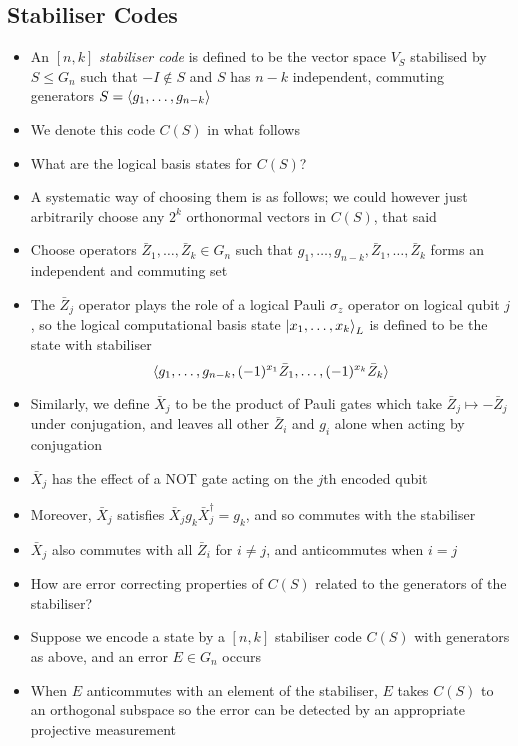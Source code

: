 \documentclass[12pt,a4paper]{article}
\numberwithin{equation}{section}
\begin{document}
	\subsection{Stabiliser Codes}
	\begin{itemize}
		\item An $[n,k]$ \textit{stabiliser code} is defined to be the vector space $V_{S}$ stabilised by $S\leq G_{n}$ such that $-I\notin S$ and $S$ has $n-k$ independent, commuting generators $S=\braket{g_{1},\ldots, g_{n-k}}$
		\item We denote this code $C(S)$ in what follows
		\item What are the logical basis states for $C(S)$?
		\item A systematic way of choosing them is as follows; we could however just arbitrarily choose any $2^{k}$ orthonormal vectors in $C(S)$, that said
		\item Choose operators $\bar{Z}_{1},\ldots, \bar{Z}_{k}\in G_{n}$ such that $g_{1},\ldots, g_{n-k},\bar{Z}_{1},\ldots, \bar{Z}_{k}$ forms an independent and commuting set
		\item The $\bar{Z}_{j}$ operator plays the role of a logical Pauli $\sigma_{z}$ operator on logical qubit $j$, so the logical computational basis state $\ket{x_{1},\ldots, x_{k}}_{L}$ is defined to be the state with stabiliser
		\begin{equation}
			\braket{g_{1},\ldots, g_{n-k},(-1)^{x_{1}}\bar{Z}_{1},\ldots, (-1)^{x_{k}}\bar{Z}_{k}}
		\end{equation}
		\item Similarly, we define $\bar{X}_{j}$ to be the product of Pauli gates which take $\bar{Z}_{j}\mapsto -\bar{Z}_{j}$ under conjugation, and leaves all other $\bar{Z}_{i}$ and $g_{i}$ alone when acting by conjugation
		\item $\bar{X}_{j}$ has the effect of a NOT gate acting on the $j$th encoded qubit
		\item Moreover, $\bar{X}_{j}$ satisfies $\bar{X}_{j}g_{k}\bar{X}_{j}^{\dagger}=g_{k}$, and so commutes with the stabiliser
		\item $\bar{X}_{j}$ also commutes with all $\bar{Z}_{i}$ for $i\neq j$, and anticommutes when $i=j$
		\item How are error correcting properties of $C(S)$ related to the generators of the stabiliser?
		\item Suppose we encode a state by a $[n,k]$ stabiliser code $C(S)$ with generators as above, and an error $E\in G_{n}$ occurs
		\item When $E$ anticommutes with an element of the stabiliser, $E$ takes $C(S)$ to an orthogonal subspace so the error can be detected by an appropriate projective measurement

\end{itemize}
\end{document}
